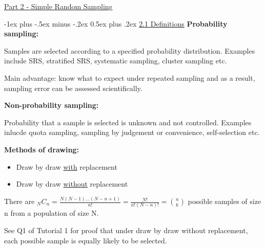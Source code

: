 \documentclass[10pt,landscape]{article}
\makeatletter
\renewcommand{\section}{\@startsection{section}{1}{0mm}%
                                {-1ex plus -.5ex minus -.2ex}%
                                {0.5ex plus .2ex}%
                                {\normalfont\large\bfseries}}
\makeatother
\begin{document}
\raggedright
\footnotesize
\begin{multicols}{3}


\setlength{\premulticols}{1pt}
\setlength{\postmulticols}{1pt}
\setlength{\multicolsep}{1pt}
\setlength{\columnsep}{2pt}

\begin{center}
     \Large{\underline{Part 2 - Simple Random Sampling}} \\
\end{center}

\section{\underline{2.1 Definitions}}
\textbf{Probability sampling: }

Samples are selected according to a specified probability distribution. Examples include SRS, stratified SRS, systematic sampling, cluster sampling etc.

Main advantage: know what to expect under repeated sampling and as a result, sampling error can be assessed scientifically.

\vspace{10}

\textbf{Non-probability sampling: }

Probability that a sample is selected is unknown and not controlled. Examples inlucde quota sampling, sampling by judgement or convenience, self-selection etc.

\vspace{10}

\textbf{Methods of drawing: }
\begin{itemize}
  \item Draw by draw \underline{with} replacement
  \item Draw by draw \underline{without} replacement
\end{itemize}

There are $_{N}C_{n}=\frac{N(N-1)...(N-n+1)}{n!}= \frac{N!}{n!(N-n)!}=\binom nk$ possible samples of size n from a population of size N.

\vspace{5}

See Q1 of Tutorial 1 for proof that under draw by draw without replacement, each possible sample is equally likely to be selected.

\vspace{10}


\end{multicols}
\end{document}
